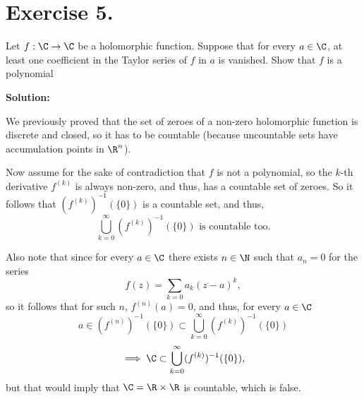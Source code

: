 \section*{Exercise 5.}

Let $f:\C \to \C$ be a holomorphic function. Suppose that for every $a \in \C$, at least one coefficient in the Taylor series of $f$ in $a$ is vanished. Show that $f$ is a polynomial

\textbf{Solution:}

We previously proved that the set of zeroes of a non-zero holomorphic function is discrete and closed, so it has to be countable (because uncountable sets have accumulation points in $\R^n$). 

Now assume for the sake of contradiction that $f$ is not a polynomial, so the $k$-th derivative $f^{(k)}$ is always non-zero, and thus, has a countable set of zeroes. So it follows that $(f^{(k)})^{-1}(\{0\})$ is a countable set, and thus,
\[ \bigcup_{k = 0}^{\infty}(f^{(k)})^{-1}(\{0\})\mbox{ is countable too.} \]

Also note that since for every $a\in \C$ there exists $n\in \N$ such that $a_n = 0$ for the series
\[ f(z) = \sum_{k = 0} a_k(z-a)^k, \]
so it follows that for such $n$, $f^{(n)}(a) = 0$, and thus, for every $a \in \C$
\[ a \in (f^{(n)})^{-1}(\{0\}) \subset \bigcup_{k = 0}^{\infty}(f^{(k)})^{-1}(\{0\}) \]
\[ \implies \C \subset \bigcup_{k = 0}^{\infty}(f^{(k)})^{-1}(\{0\}), \]
but that would imply that $\C = \R \times \R$ is countable, which is false.